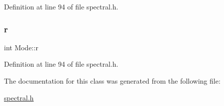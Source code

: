 Definition at line 94 of file spectral.\+h.

\mbox{\label{classMode_ab44e744cb1dc0a82416546ad4a1c7068}} 
\subsubsection{\texorpdfstring{r}{r}}
{\footnotesize\ttfamily int Mode\+::r\hspace{0.3cm}{\ttfamily [private]}}



Definition at line 94 of file spectral.\+h.



The documentation for this class was generated from the following file\+:\begin{DoxyCompactItemize}
\item 
\hyperlink{spectral_8h}{spectral.\+h}\end{DoxyCompactItemize}
